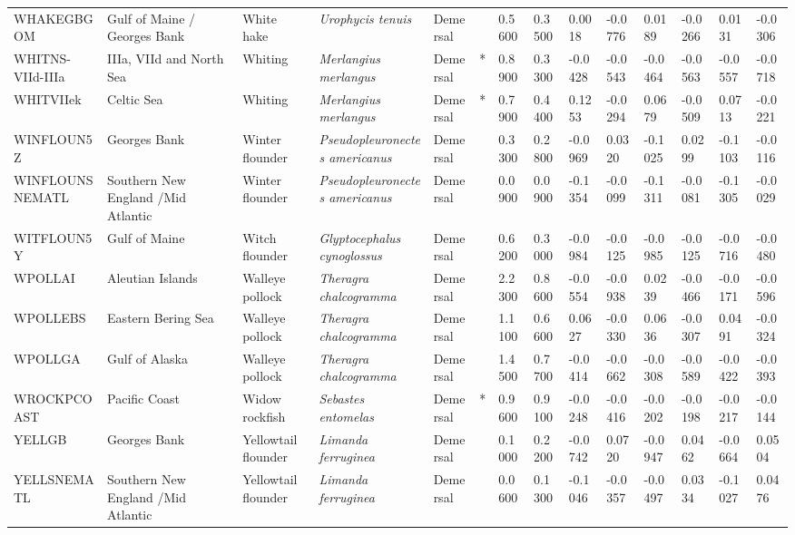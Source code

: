 \begin{longtable}{p{2.6cm}p{1.9cm}p{1.7cm}p{1.6cm}p{1cm}p{0.3cm}p{1cm}p{1cm}p{1cm}p{1.1cm}p{1cm}p{1.1cm}p{1cm}p{1.1cm}}
  WHAKEGBGOM & Gulf of Maine / Georges Bank & White hake & \textit{Urophycis tenuis} & Demersal &   & 0.5600 & 0.3500 & 0.0018 & -0.0776 & 0.0189 & -0.0266 & 0.0131 & -0.0306 \\ 
  WHITNS-VIId-IIIa & IIIa, VIId and North Sea & Whiting & \textit{Merlangius merlangus} & Demersal & * & 0.8900 & 0.3300 & -0.0428 & -0.0543 & -0.0464 & -0.0563 & -0.0557 & -0.0718 \\ 
  WHITVIIek & Celtic Sea & Whiting & \textit{Merlangius merlangus} & Demersal & * & 0.7900 & 0.4400 & 0.1253 & -0.0294 & 0.0679 & -0.0509 & 0.0713 & -0.0221 \\ 
  WINFLOUN5Z & Georges Bank & Winter flounder & \textit{Pseudopleuronectes americanus} & Demersal &   & 0.3300 & 0.2800 & -0.0969 & 0.0320 & -0.1025 & 0.0299 & -0.1103 & -0.0116 \\ 
  WINFLOUNSNEMATL & Southern New England /Mid Atlantic & Winter flounder & \textit{Pseudopleuronectes americanus} & Demersal &   & 0.0900 & 0.0900 & -0.1354 & -0.0099 & -0.1311 & -0.0081 & -0.1305 & -0.0029 \\ 
  WITFLOUN5Y & Gulf of Maine & Witch flounder & \textit{Glyptocephalus cynoglossus} & Demersal &   & 0.6200 & 0.3000 & -0.0984 & -0.0125 & -0.0985 & -0.0125 & -0.0716 & -0.0480 \\ 
  WPOLLAI & Aleutian Islands & Walleye pollock & \textit{Theragra chalcogramma} & Demersal &   & 2.2300 & 0.8600 & -0.0554 & -0.0938 & 0.0239 & -0.0466 & -0.0171 & -0.0596 \\ 
  WPOLLEBS & Eastern Bering Sea & Walleye pollock & \textit{Theragra chalcogramma} & Demersal &   & 1.1100 & 0.6600 & 0.0627 & -0.0330 & 0.0636 & -0.0307 & 0.0491 & -0.0324 \\ 
  WPOLLGA & Gulf of Alaska & Walleye pollock & \textit{Theragra chalcogramma} & Demersal &   & 1.4500 & 0.7700 & -0.0414 & -0.0662 & -0.0308 & -0.0589 & -0.0422 & -0.0393 \\ 
  WROCKPCOAST & Pacific Coast & Widow rockfish & \textit{Sebastes entomelas} & Demersal & * & 0.9600 & 0.9100 & -0.0248 & -0.0416 & -0.0202 & -0.0198 & -0.0217 & -0.0144 \\ 
  YELLGB & Georges Bank & Yellowtail flounder & \textit{Limanda ferruginea} & Demersal &   & 0.1000 & 0.2200 & -0.0742 & 0.0720 & -0.0947 & 0.0462 & -0.0664 & 0.0504 \\ 
  YELLSNEMATL & Southern New England /Mid Atlantic & Yellowtail flounder & \textit{Limanda ferruginea} & Demersal &   & 0.0600 & 0.1300 & -0.1046 & -0.0357 & -0.0497 & 0.0334 & -0.1027 & 0.0476 \\ 

\end{longtable}
